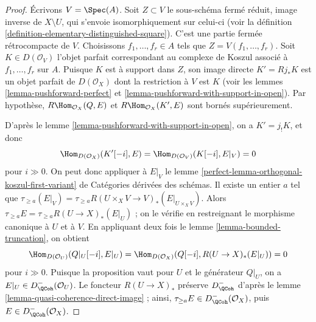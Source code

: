 \begin{proof}
\medskip\noindent
\'Ecrivons $V=\Spec(A)$. Soit $Z\subset V$ le sous-sch\'ema ferm\'e r\'eduit,
image inverse de $X\setminus U$, qui s'envoie isomorphiquement sur celui-ci
(voir la d\'efinition \ref{definition-elementary-distinguished-square}).
C'est une partie ferm\'ee r\'etrocompacte de $V$. Choisissons
$f_1,\ldots,f_r\in A$ tels que $Z=V(f_1,\ldots,f_r)$. Soit
$K\in D(\mathcal{O}_V)$ l'objet parfait correspondant au complexe de Koszul
associ\'e \`a $f_1,\ldots,f_r$ sur $A$. Puisque $K$ est \`a support dans $Z$,
son image directe $K'=Rj_*K$ est un objet parfait de $D(\mathcal{O}_X)$ dont
la restriction \`a $V$ est $K$ (voir les lemmes
\ref{lemma-pushforward-perfect} et
\ref{lemma-pushforward-with-support-in-open}). Par hypoth\`ese,
$R\Hom_{\mathcal{O}_X}(Q,E)$ et $R\Hom_{\mathcal{O}_X}(K',E)$ sont born\'es
sup\'erieurement.

\medskip\noindent
D'apr\`es le lemme \ref{lemma-pushforward-with-support-in-open}, on a
$K'=j_!K$, et donc
$$
\Hom_{D(\mathcal{O}_X)}(K'[-i], E) = \Hom_{D(\mathcal{O}_V)}(K[-i], E|_V) = 0
$$
pour $i\gg0$. On peut donc appliquer \`a $E|_V$ le lemme
\ref{perfect-lemma-orthogonal-koszul-first-variant} de Cat\'egories d\'eriv\'ees
des sch\'emas. Il existe un entier $a$ tel que
$\tau_{\geq a}(E|_V)=
\tau_{\geq a}R(U\times_XV\to V)_*(E|_{U\times_XV})$.
Alors $\tau_{\geq a}E=\tau_{\geq a}R(U\to X)_*(E|_U)$ ; on le v\'erifie en
restreignant le morphisme canonique \`a $U$ et \`a $V$. En appliquant deux fois
le lemme \ref{lemma-bounded-truncation}, on obtient
$$
\Hom_{D(\mathcal{O}_U)}(Q|_U [-i], E|_U) =
\Hom_{D(\mathcal{O}_X)}(Q[-i], R (U \to X)_* (E|_U)) = 0
$$
pour $i\gg0$. Puisque la proposition vaut pour $U$ et le g\'en\'erateur
$Q|_U$, on a $E|_U\in D^-_\QCoh(\mathcal{O}_U)$. Le foncteur
$R(U\to X)_*$ pr\'eserve $D^-_\QCoh$ d'apr\`es le lemme
\ref{lemma-quasi-coherence-direct-image} ; ainsi,
$\tau_{\geq a}E\in D^-_\QCoh(\mathcal{O}_X)$, puis
$E\in D^-_\QCoh(\mathcal{O}_X)$.
\end{proof}

